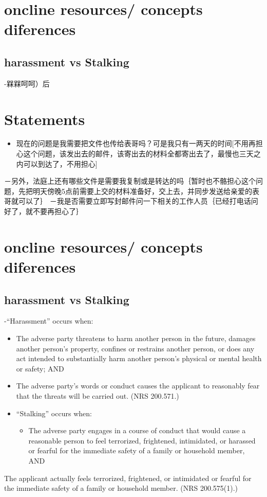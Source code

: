\documentclass[9pt, b5paaper]{book}
\begin{document}
\chapter{oncline resources/ concepts diferences}
\label{sec-5}
\section{harassment vs Stalking}
\label{sec-5-1}
-槑槑呵呵）后
\chapter{Statements}
\label{sec-6}
\begin{itemize}
\item 现在的问题是我需要把文件也传给表哥吗？可是我只有一两天的时间[不用再担心这个问题，该发出去的邮件，该寄出去的材料全都寄出去了，最慢也三天之内可以到达了，不用担心]
\end{itemize}
－另外，法庭上还有哪些文件是需要我复制或是转达的吗｛暂时也不骼担心这个问题，先把明天傍晚5点前需要上交的材料准备好，交上去，并同步发送给亲爱的表哥就可以了｝
－我是否需要立即写封邮件问一下相关的工作人员｛已经打电话问好了，就不要再担心了｝
\chapter{oncline resources/ concepts diferences}
\label{sec-7}
\section{harassment vs Stalking}
\label{sec-7-1}
-“Harassment” occurs when:
\begin{itemize}
\item The adverse party threatens to harm another person in the future, damages another person’s property, confines or restrains another person, or does any act intended to substantially harm another person’s physical or mental health or safety; AND
\item The adverse party’s words or conduct causes the applicant to reasonably fear that the threats will be carried out.  (NRS 200.571.)
\item “Stalking” occurs when: 
\begin{itemize}
\item The adverse party engages in a course of conduct that would cause a reasonable person to feel terrorized, frightened, intimidated, or harassed or fearful for the immediate safety of a family or household member, AND
\end{itemize}
\end{itemize}
The applicant actually feels terrorized, frightened, or intimidated or fearful for the immediate safety of a family or household member.  (NRS 200.575(1).)
\end{document}
